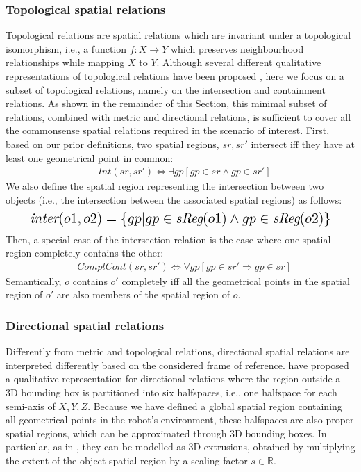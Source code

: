 \documentclass{article}
\begin{document}
\subsubsection{Topological spatial relations}
Topological relations are spatial relations which are invariant under a topological isomorphism, i.e., a function $f: X \to Y$ which preserves neighbourhood relationships while mapping $X$ to $Y$. Although several different qualitative representations of topological relations have been proposed \cite{cohn_chapter_2008}, here we focus on a subset of topological relations, namely on the intersection and containment relations. As shown in the remainder of this Section, this minimal subset of relations, combined with metric and directional relations, is sufficient to cover all the commonsense spatial relations required in the scenario of interest. First, based on our prior definitions, two spatial regions, $sr,sr'$ intersect iff they have at least one geometrical point in common:
\begin{align}
    & \textit{Int}(sr,sr') \Leftrightarrow \exists gp [gp \in sr \wedge 
      gp \in sr']
\end{align}
We also define the spatial region representing the intersection between two objects (i.e., the intersection between the associated spatial regions) as follows:
\begin{equation}
\resizebox{.9\linewidth}{!}{$
    \displaystyle
    \textit{inter}(o1, o2) = \{gp | gp \in \textit{sReg}(o1) \wedge gp \in \textit{sReg}(o2)\}
$}
\end{equation}
Then, a special case of the intersection relation is the case where one spatial region completely contains the other: 
\begin{align}
   & \textit{ComplCont}(sr,sr') \Leftrightarrow  \forall gp 
    [gp \in sr'  \Rightarrow 
    gp \in sr] 
\end{align}
Semantically, $o$ contains $o'$ completely iff all the geometrical points in the spatial region of $o'$ are also members of the spatial region of $o$. 

\subsubsection{Directional spatial relations}
Differently from metric and topological relations, directional spatial relations are interpreted differently based on the considered frame of reference. \cite{borrmann_query_2010} have proposed a qualitative representation for directional relations where the region outside a 3D bounding box is partitioned into six halfspaces, i.e., one halfspace for each semi-axis of $X,Y,Z$. Because we have defined a global spatial region containing all geometrical points in the robot's environment, these halfspaces are also proper spatial regions, which can be approximated through 3D bounding boxes. In particular, as in \cite{deeken_grounding_2018}, they can be modelled as 3D extrusions, obtained by multiplying the extent of the object spatial region by a scaling factor $s \in \mathbb{R}$. 
\end{document}
